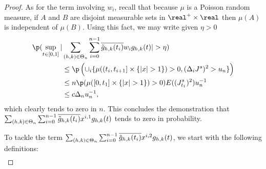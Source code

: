 \begin{proof}
As for the term involving $w_i$,   recall  that because $\mu$ is a Poisson random measure, if $A$ and  $B$ are disjoint measurable sets  in $\real^+\times \real$    then $\mu(A)$ is independent of $\mu(B)$. Using this fact, we may write  given $\eta > 0$    
\begin{align} 
  \p( \sup_{t \in \domain}\vert &\sumt \sumin \btghki w_i \ghk(t)\vert > \eta) \notag \\
  &\le \p\left(\cup_i\{\mu( (t_i, t_{i + 1}] \times \{\vert x \vert > 1\}) > 0   , (\djt)^2 > u_n\}\right) \notag \\ 
  & \le n \p(\mu( [0, t_1] \times \{\vert x \vert > 1\}) > 0 ) E( ( J^s_{t_1})^2) u_n^{-1} \notag \\ 
  & \le c \Delta_n u_n^{-1}\notag,
\end{align} 
which clearly tends to zero in $n$. This concludes the demonstration that $ \sum_{(h,k) \in \Theta_n} \sum_{i = 0}^{n-1} \overline{\tilde{g}_{h,k}(t_i)} x^{i,1} g_{h,k}(t)$ tends to zero in probability.  
  \begin{comment}
\p(v_n > \delta /2) & \le 2cKH_n\delta^{-1}E(n^{-1} \log(n) \sumin I_{\{(\djt)^2 > u_n\}}) + \p(\Lambda > K) \notag  \\ & = 2cK H_n\delta^{-1}\log(n) \p( (\Delta_{1/n}J^s)^2 > u_n)  + \varepsilon/2 \notag \\ &\le  2cK H_n\delta^{-1}\log(n) E((\Delta_{1/n} J^s)^2))u_n^{-1}   + \varepsilon/2 \notag \\ &\le 2cKH_n\delta^{-1} \log(n) n^{-1}\kappa u_n^{-1} +  \varepsilon/2\label{eq:asabove} \end{align} where $\kappa := E((\Delta_1 J^s)^2)) < \infty$.  Obviously there is a large enough $n$ such that the first expression above is less than or equal to $\varepsilon/2$.
\end{comment}
\begin{comment} Moreover, because $\delta >  0$,  \begin{align} \p(w_n > \delta/2) & \le \p\left(\cup_i\{I_{\{\vert x \vert > 1\}}\ast \mu( (t_i, t_{i + 1}] \times \real) > 0   , (\djt)^2 > u_n\}\right) \notag \\ & \le n \p(\mu( [0, 1/n] \times \{\vert x \vert > 1\}) > 0 ) E( (\Delta_1 J^s)^2) u_n^{-1} \notag \\ & \le c n^{-1} \kappa u_n^{-1}\notag,\end{align} which clearly tends to zero in $n$. 
\end{comment}
To tackle the term $ \sum_{(h,k) \in \Theta_n} \sum_{i = 0}^{n-1} \overline{\tilde{g}_{h,k}(t_i)} x^{i,2} g_{h,k}(t)$, we start with the following definitions:
\begin{align}

\end{align}
\end{proof}
